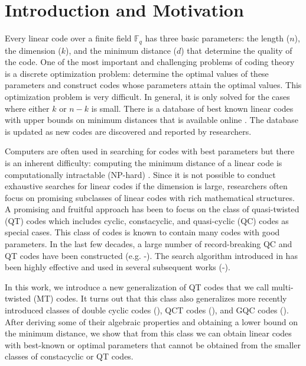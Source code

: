 \documentclass[preprint,12pt]{elsarticle}
\begin{document}


\section{Introduction and Motivation}
Every linear code over a finite field $\mathbb{F}_q$ has three basic parameters: the length ($n$), the dimension ($k$), and the minimum distance ($d$) that determine the quality of the code. One of the most important and challenging problems of coding theory is a discrete optimization problem:  determine the optimal values of these parameters and construct codes whose parameters attain the optimal values. This optimization problem is very difficult. In general, it is only solved for the cases where either $k$ or $n-k$ is small. There is a database of best known linear codes with upper bounds on minimum distances that is available online \cite{table}. The database is updated as new codes are discovered and reported by researchers. 
   
Computers are often used in searching for codes with best parameters but there is an inherent difficulty: computing the minimum distance of a linear code is computationally intractable (NP-hard) \cite{NPhard}. Since it is not possible to conduct exhaustive searches for linear codes if the dimension is large, researchers often focus on promising subclasses of linear codes with rich mathematical structures. A promising and fruitful approach has been to focus on the class of quasi-twisted (QT) codes which includes cyclic, constacyclic, and quasi-cyclic (QC) codes as special cases.  This class of codes is known to contain many codes with good parameters. In the last few decades, a large number of record-breaking QC and QT codes have been constructed (e.g. \cite{qc1}-\cite{qc7}). The search algorithm  introduced in \cite{qtmain} has been highly effective and used in several subsequent works (\cite{qc3}-\cite{qc7}).

In this work, we introduce a new generalization of QT codes that we call multi-twisted (MT) codes. It turns out that this class  also generalizes more recently introduced classes of double cyclic codes (\cite{qc1,qc2}), QCT codes (\cite{qct}), and GQC codes (\cite{gqc}). After deriving some of their algebraic properties and obtaining a lower bound on the minimum distance, we show that from this class we can obtain linear codes with best-known or optimal parameters that cannot be obtained from the smaller classes of constacyclic or QT codes. 
\end{document}
